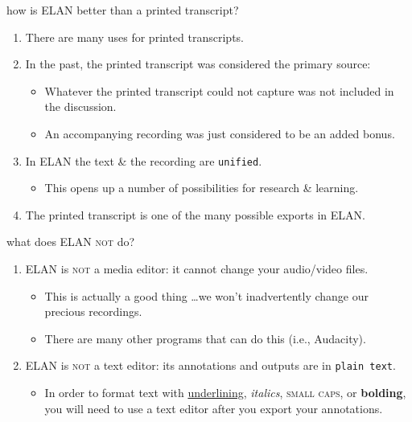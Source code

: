 \documentclass{beamer}
\begin{document}
    \begin{frame}{how is ELAN better than a printed transcript?}
      \begin{enumerate}
      \item<2-> There are many uses for printed transcripts.
      \item<3-> In the past, the printed transcript was considered the primary source:
        \begin{itemize}
          \item<4-> Whatever the printed transcript could not capture was not included in the discussion.
          \item<4-> An accompanying recording was just considered to be an added bonus.
        \end{itemize}
      \item<5-> In ELAN the text \& the recording are \texttt{unified}.
        \begin{itemize}
          \item<6-> This opens up a number of possibilities for research \& learning.
        \end{itemize}
      \item<7-> The printed transcript is one of the many possible exports in ELAN.
      \end{enumerate}
    \end{frame}
    
    \begin{frame}{what does ELAN \textsc{not} do?}
      \begin{enumerate}
        \item<1-> ELAN is \textsc{not} a media editor: it cannot change your audio/video files.
          \begin{itemize}
            \item<2-> This is actually a good thing \ldots we won't inadvertently change our precious recordings.
            \item<2-> There are many other programs that can do this (i.e., Audacity).
          \end{itemize}
        \item<3-> ELAN is \textsc{not} a text editor: its annotations and outputs are in \texttt{plain text}.
          \begin{itemize}
            \item<4-> In order to format text with \underline{underlining}, \textit{italics}, \textsc{small caps}, or \textbf{bolding}, you will need to use a text editor after you export your annotations.   
          \end{itemize}
      \end{enumerate}
    \end{frame}
        
\end{document}
